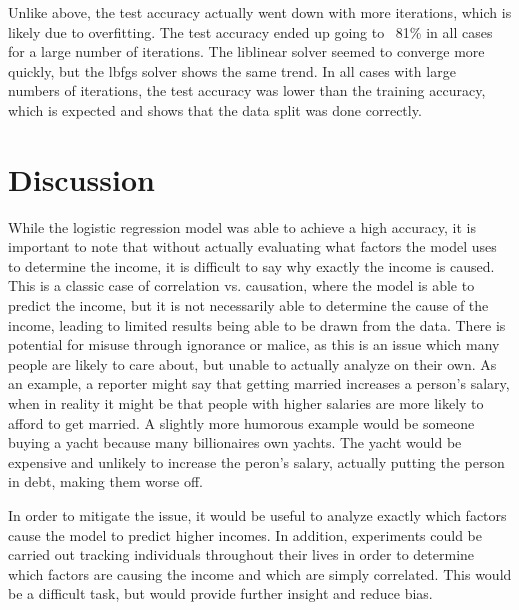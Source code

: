 \documentclass[12pt]{article}
\begin{document}
Unlike above, the test accuracy actually went down with more iterations, which is 
likely due to overfitting. The test accuracy ended up going to ~81\% in all 
cases for a large number of iterations. The liblinear solver seemed to converge 
more quickly, but the lbfgs solver shows the same trend. In all 
cases with large numbers of iterations,
the test accuracy was lower than the training accuracy, which 
is expected and shows that the data split was done correctly.

\section{Discussion}

While the logistic regression model was able to achieve a high accuracy,
 it is important to note that without actually evaluating what factors the 
 model uses to determine the income, it is difficult to say why 
 exactly the income is caused. This is a classic case of correlation vs.
 causation, where the model is able to predict the income, but it is not
 necessarily able to determine the cause of the income, leading to limited 
 results being able to be drawn from the data. There is potential for misuse 
 through ignorance or malice, as this is an issue which many people are likely to care 
 about, but unable to actually analyze on their own. As an example, a reporter
 might say that getting married increases a person's salary, when in reality 
 it might be that people with higher salaries are more likely to afford to 
 get married. A slightly more humorous example would be someone buying a 
 yacht because many billionaires own yachts. The yacht would be 
 expensive and unlikely to increase the peron's salary,
  actually putting the person in debt, making them worse off.

 In order to mitigate the issue, it would be useful to analyze exactly 
 which factors cause the model to predict higher incomes. In addition, 
 experiments could be carried out tracking individuals throughout their 
 lives in order to determine which factors are causing the income and which 
 are simply correlated. This would be a difficult task, but would provide
 further insight and reduce bias.
\end{document}
